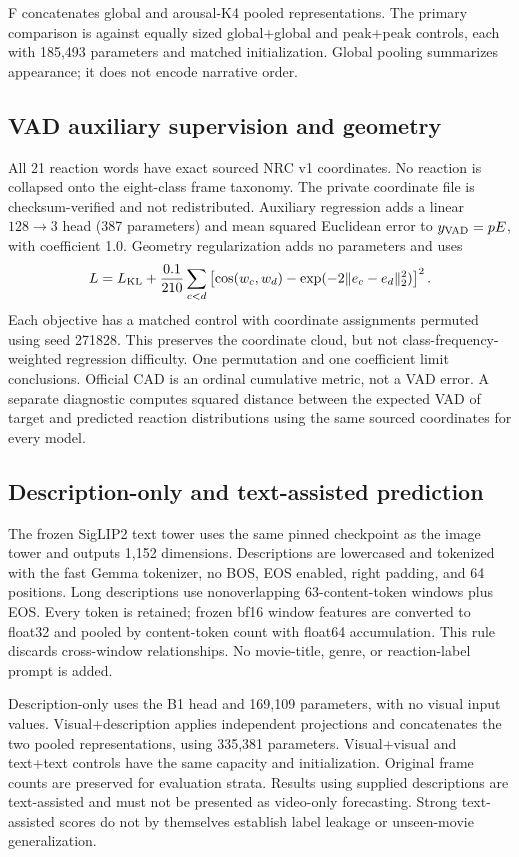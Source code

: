 F concatenates global and arousal-K4 pooled representations. The primary comparison is against equally sized global+global and peak+peak controls, each with 185,493 parameters and matched initialization. Global pooling summarizes appearance; it does not encode narrative order.

\subsection{VAD auxiliary supervision and geometry}
All 21 reaction words have exact sourced NRC v1 coordinates. No reaction is collapsed onto the eight-class frame taxonomy. The private coordinate file is checksum-verified and not redistributed. Auxiliary regression adds a linear $128\to3$ head (387 parameters) and mean squared Euclidean error to $y_{\rm VAD}=pE$, with coefficient 1.0. Geometry regularization adds no parameters and uses
\begin{equation}
L=L_{\rm KL}+\frac{0.1}{210}\sum_{c<d}
\left[\cos(w_c,w_d)-\exp(-2\|e_c-e_d\|_2^2)\right]^2.
\end{equation}
Each objective has a matched control with coordinate assignments permuted using seed 271828. This preserves the coordinate cloud, but not class-frequency-weighted regression difficulty. One permutation and one coefficient limit conclusions. Official CAD is an ordinal cumulative metric, not a VAD error. A separate diagnostic computes squared distance between the expected VAD of target and predicted reaction distributions using the same sourced coordinates for every model.

\subsection{Description-only and text-assisted prediction}
The frozen SigLIP2 text tower uses the same pinned checkpoint as the image tower and outputs 1,152 dimensions. Descriptions are lowercased and tokenized with the fast Gemma tokenizer, no BOS, EOS enabled, right padding, and 64 positions. Long descriptions use nonoverlapping 63-content-token windows plus EOS. Every token is retained; frozen bf16 window features are converted to float32 and pooled by content-token count with float64 accumulation. This rule discards cross-window relationships. No movie-title, genre, or reaction-label prompt is added.

Description-only uses the B1 head and 169,109 parameters, with no visual input values. Visual+description applies independent projections and concatenates the two pooled representations, using 335,381 parameters. Visual+visual and text+text controls have the same capacity and initialization. Original frame counts are preserved for evaluation strata. Results using supplied descriptions are text-assisted and must not be presented as video-only forecasting. Strong text-assisted scores do not by themselves establish label leakage or unseen-movie generalization.

